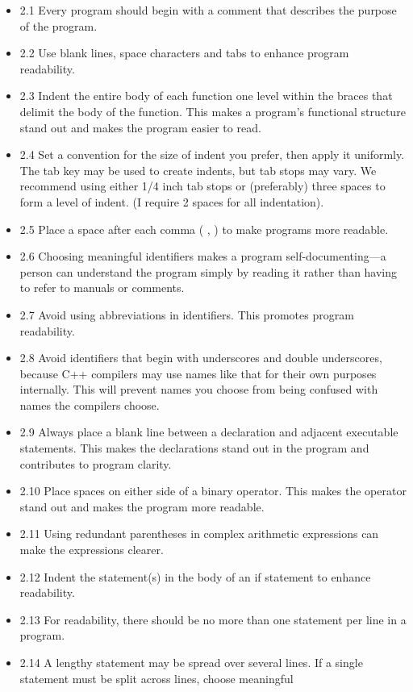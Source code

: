 \documentclass[11pt]{article}
\begin{document}
\begin{itemize}
\item 2.1 Every program should begin with a comment that describes the
purpose of the program.
\item 2.2 Use blank lines, space characters and tabs to enhance program readability.
\item 2.3 Indent the entire body of each function one level within the
braces that delimit the body of the function. This makes a program’s
functional structure stand out and makes the program easier to read.
\item 2.4 Set a convention for the size of indent you prefer, then apply
it uniformly. The tab key may be used to create indents, but tab
stops may vary. We recommend using either 1/4 inch tab stops or
(preferably) three spaces to form a level of indent. (I require 2
spaces for all indentation).
\item 2.5 Place a space after each comma ( , ) to make programs more readable.
\item 2.6 Choosing meaningful identifiers makes a program
self-documenting—a person can understand the program simply by
reading it rather than having to refer to manuals or comments.
\item 2.7 Avoid using abbreviations in identifiers. This promotes program
readability.
\item 2.8 Avoid identifiers that begin with underscores and double
underscores, because C++ compilers may use names like that for their
own purposes internally. This will prevent names you choose from
being confused with names the compilers choose.
\item 2.9 Always place a blank line between a declaration and adjacent
executable statements. This makes the declarations stand out in the
program and contributes to program clarity.
\item 2.10 Place spaces on either side of a binary operator. This makes
the operator stand out and makes the program more readable.
\item 2.11 Using redundant parentheses in complex arithmetic expressions
can make the expressions clearer.
\item 2.12 Indent the statement(s) in the body of an if statement to
enhance readability.
\item 2.13 For readability, there should be no more than one statement per
line in a program.
\item 2.14 A lengthy statement may be spread over several lines. If a
single statement must be split across lines, choose meaningful

\end{itemize}
\end{document}
